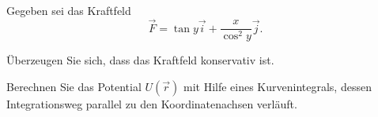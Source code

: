 \begin{atiTask}[
  title = Konservatives Vektorfeld
]
  Gegeben sei das Kraftfeld
  \begin{equation*}
  \vec{F}=\tan y\vec{i}+\frac{x}{\cos ^2 y}\vec{j}.
  \end{equation*}
 \begin{atiSubtasks}
 \item Überzeugen Sie sich, dass das Kraftfeld konservativ ist.
 \item Berechnen Sie das Potential $U(\vec{r})$ mit Hilfe eines Kurvenintegrals, dessen Integrationsweg parallel zu den Koordinatenachsen verläuft.
 \end{atiSubtasks}
\end{atiTask}
